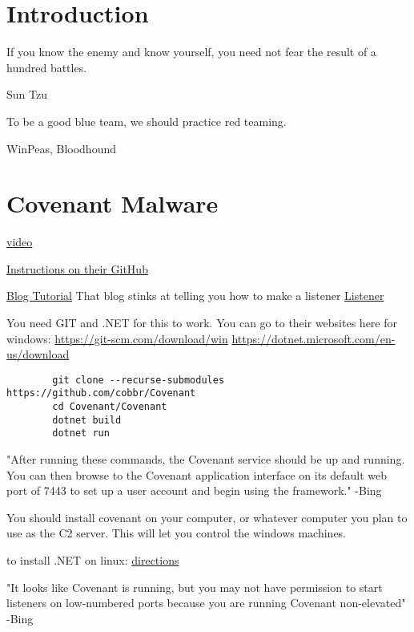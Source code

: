 \documentclass{article}
\begin{document}
\graphicspath{ {./Images/} }
\tableofcontents

\section{Introduction}
\epigraph{If you know the enemy and know yourself, you need not fear the result of a hundred battles.}{Sun Tzu}

To be a good blue team, we should practice red teaming.

WinPeas, Bloodhound

\section{Covenant Malware}
\href{https://youtu.be/Fi0jXm8VOFU}{video}

\href{https://github.com/cobbr/Covenant/wiki/Installation-And-Startup}{Instructions on their GitHub}

\href{https://blog.netwrix.com/2022/12/16/covenant-c2-tutorial/}{Blog Tutorial}
That blog stinks at telling you how to make a listener
\href{https://github.com/cobbr/Covenant-wiki/blob/master/Listeners.md}{Listener}

You need GIT and .NET for this to work. You can go to their websites here for windows:
\href{https://git-scm.com/download/win}{https://git-scm.com/download/win}
\href{https://dotnet.microsoft.com/en-us/download}{https://dotnet.microsoft.com/en-us/download}
\begin{lstlisting}
        git clone --recurse-submodules https://github.com/cobbr/Covenant
        cd Covenant/Covenant
        dotnet build
        dotnet run
\end{lstlisting}

"After running these commands, the Covenant service should be up and running. 
You can then browse to the Covenant application interface on its default web port of 
7443 to set up a user account and begin using the framework." -Bing

You should install covenant on your computer, or whatever computer you
plan to use as the C2 server. This will let you control the windows machines.

to install .NET on linux: 
\href{https://learn.microsoft.com/en-us/dotnet/core/install/linux-scripted-manual#scripted-install}{directions}

"It looks like Covenant is running, but you may not have permission to start 
listeners on low-numbered ports because you are running Covenant non-elevated" -Bing
\end{document}
